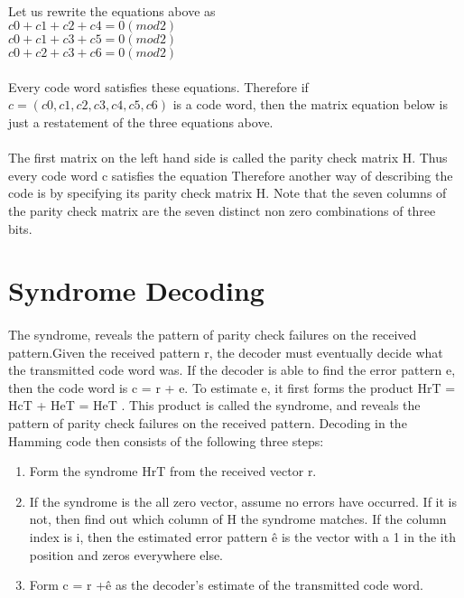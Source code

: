 \documentclass[14pt]{report}
\begin{document}
{\paragraph{} Let us rewrite the equations above as\\
$c0 + c1 + c2 + c4 = 0 (mod 2)$\\
$c0 + c1 + c3 + c5 = 0 (mod 2)$\\
$c0 + c2 + c3 + c6 = 0 (mod 2)$
\paragraph{} Every code word satisfies these equations. Therefore if $c = (c0, c1, c2, c3, c4, c5, c6)$ is a code word, then the matrix equation below is just a restatement of the three equations above.                
\paragraph{} The first matrix on the left hand side is called the parity check matrix H. Thus every code word c satisfies the equation Therefore another way of describing the code is by specifying its parity check matrix H. Note that the seven columns of the parity check matrix are the seven distinct non zero combinations of three bits.
\section{Syndrome Decoding}
\paragraph{} The syndrome, reveals the pattern of parity check failures on the received pattern.Given the received pattern r, the decoder must eventually decide what the transmitted code word was. If the decoder is able to find the error pattern e, then the code word is c = r + e. To estimate e, it first forms the product HrT = HcT + HeT = HeT . This product is called the syndrome, and reveals the pattern of parity check failures on the received pattern. Decoding in the Hamming code then consists of the following three steps:
\begin{enumerate}
\item Form the syndrome HrT from the received vector r. 
\item If the syndrome is the all zero vector, assume no errors have occurred. If it is not, then find out which column of H the syndrome matches. If the column index is i, then the estimated error pattern ê is the vector with a 1 in the ith position and zeros everywhere else.
\item Form c = r +ê as the decoder’s estimate of the transmitted code word.
\end{enumerate}

}
\end{document}
